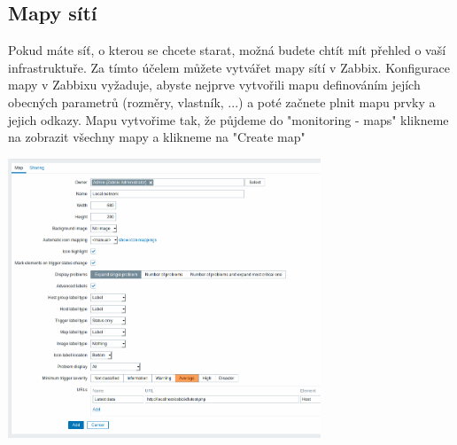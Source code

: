 \documentclass{article}
\begin{document}
  \subsection{Mapy sítí}
  Pokud máte síť, o kterou se chcete starat, možná budete chtít mít přehled o vaší infrastruktuře. Za tímto účelem můžete vytvářet mapy sítí v Zabbix.
  \newline
  Konfigurace mapy v Zabbixu vyžaduje, abyste nejprve vytvořili mapu definováním jejích obecných parametrů (rozměry, vlastník, ...) a poté začnete plnit mapu prvky a jejich odkazy.
  \newline
  Mapu vytvořime tak, že půjdeme do "monitoring - maps" klikneme na zobrazit všechny mapy a klikneme na "Create map"
  \begin{center}
        \includegraphics[width=0.7\textwidth]{obrazky/map_config.png}
\end{center}
\end{document}
